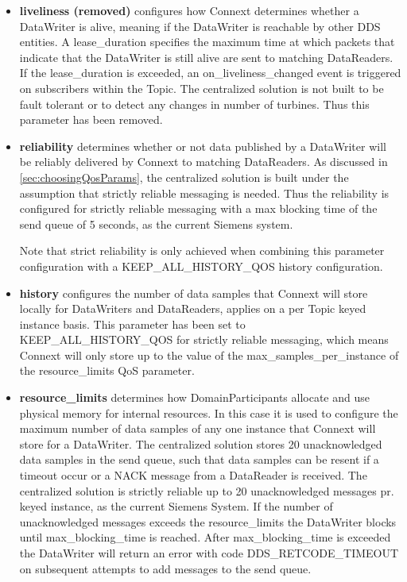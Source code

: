 \begin{itemize}
	\item \textbf{liveliness (removed)} configures how Connext determines whether a DataWriter is alive, meaning if the DataWriter is reachable by other DDS entities. A lease\_duration specifies the maximum time at which packets that indicate that the DataWriter is still alive are sent to matching DataReaders. If the lease\_duration is exceeded, an on\_liveliness\_changed event is triggered on subscribers within the Topic. The centralized solution is not built to be fault tolerant or to detect any changes in number of turbines. Thus this parameter has been removed.
	
	\item \textbf{reliability} determines whether or not data published by a DataWriter will be reliably delivered by Connext to matching DataReaders. As discussed in \cref{sec:choosingQosParams}, the centralized solution is built under the assumption that strictly reliable messaging is needed. Thus the reliability is configured for strictly reliable messaging with a max blocking time of the send queue of 5 seconds, as the current Siemens system.
	
	Note that strict reliability is only achieved when combining this parameter configuration with a KEEP\_ALL\_HISTORY\_QOS history configuration.
	
	\item \textbf{history} configures the number of data samples that Connext will store locally for DataWriters and DataReaders, applies on a per Topic keyed instance basis. This parameter has been set to KEEP\_ALL\_HISTORY\_QOS for strictly reliable messaging, which means Connext will only store up to the value of the max\_samples\_per\-\_instance of the resource\_limits QoS parameter.
	
	\item \textbf{resource\_limits} determines how DomainParticipants allocate and use physical memory for internal resources. In this case it is used to configure the maximum number of data samples of any one instance that Connext will store for a DataWriter. The centralized solution stores 20 unacknowledged data samples in the send queue, such that data samples can be resent if a timeout occur or a NACK message from a DataReader is received. The centralized solution is strictly reliable up to 20 unacknowledged messages pr. keyed instance, as the current Siemens System. If the number of unacknowledged messages exceeds the resource\_limits the DataWriter blocks until max\_blocking\_time is reached. After max\_blocking\_time is exceeded the DataWriter will return an error with code DDS\_RETCODE\_TIMEOUT on subsequent attempts to add messages to the send queue.
	

\end{itemize}
